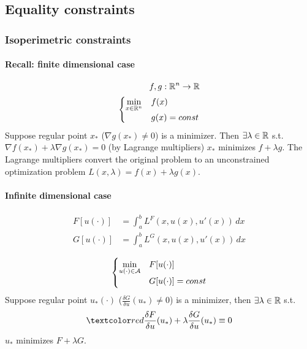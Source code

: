 \documentclass[11pt]{article}
\begin{document}
	\subsection{Equality constraints}
	\subsubsection{Isoperimetric constraints}
	\paragraph{Recall: finite dimensional case}
	\begin{align}
		f, g: \mathbb{R}^n \rightarrow \mathbb{R} \\
		\begin{cases}
			\underset{x \in \mathbb{R}^n}{\min} &f(x) \\
			&g(x) = const
		\end{cases}
	\end{align}
	Suppose regular point $x_*$ ($\nabla g(x_*) \neq 0$) is a minimizer.
	Then $\exists \lambda \in \mathbb{R}$ s.t.
	$\nabla f(x_*) + \lambda \nabla g(x_*) = 0$ (by Lagrange multipliers)
	\remark $x_*$ minimizes $f + \lambda g$. The Lagrange multipliers convert the original problem to an unconstrained optimization problem $L(x, \lambda) = f(x) + \lambda g(x)$.
	\paragraph{Infinite dimensional case}
	\begin{align}
		F[u(\cdot)] &= \int_a^b L^F(x, u(x), u'(x))\,dx \\
		G[u(\cdot)] &= \int_a^b L^G(x, u(x), u'(x))\,dx \\
	\end{align}
	$$		\begin{cases}
			\underset{u(\cdot) \in \mathcal{A}}{\min} &F[u(\cdot)] \\
			&G[u(\cdot)] = const
			\end{cases}$$
	Suppose regular point $u_*(\cdot)$ ($\frac{\delta G}{\delta u}(u_*) \neq 0$) is a minimizer, then $\exists \lambda \in \mathbb{R}$ s.t.
	$$\red{\frac{\delta F}{\delta u}(u_*) + \lambda \frac{\delta G}{\delta u}(u_*) \equiv 0} $$
	\remark $u_*$ minimizes $F + \lambda G$.
	
\end{document}
